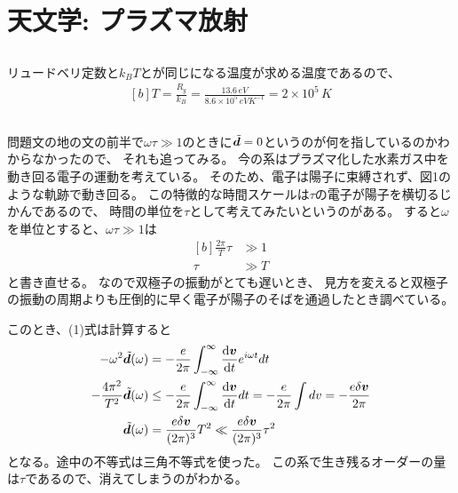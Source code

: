 \documentclass[../../sp_2017.tex]{subfiles}
\begin{document}
\setcounter{section}{5}
\section{天文学: プラズマ放射}
\subsection{}
リュードベリ定数と\(k_BT\)とが同じになる温度が求める温度であるので、
\begin{equation}\begin{aligned}[b]
    T = \frac{R_y}{k_B}=\frac{13.6 \,\si{eV}}{8.6\times 10^5 \,\si{eV K^{-1}}}= 2\times10^5 \,\si{K}
\end{aligned}\end{equation}
\subsection{}
問題文の地の文の前半で\(\omega \tau\gg 1\)のときに\(\tilde{\vb*{d}}=0\)というのが何を指しているのかわからなかったので、
それも追ってみる。
今の系はプラズマ化した水素ガス中を動き回る電子の運動を考えている。
そのため、電子は陽子に束縛されず、図1のような軌跡で動き回る。
この特徴的な時間スケールは\(\tau\)の電子が陽子を横切るじかんであるので、
時間の単位を\(\tau\)として考えてみたいというのがある。
すると\(\omega\)を単位とすると、\(\omega \tau\gg 1\)は
\begin{equation}\begin{aligned}[b]
    \frac{2\pi}{T}\tau &\gg 1\\
    \tau &\gg T
\end{aligned}\end{equation}
と書き直せる。
なので双極子の振動がとても遅いとき、
見方を変えると双極子の振動の周期よりも圧倒的に早く電子が陽子のそばを通過したとき調べている。

このとき、(1)式は計算すると
\begin{equation}\begin{aligned}[b]
    -\omega^2\tilde{\vb*{d}}(\omega)
        &= -\frac{e}{2\pi}\int_{-\infty}^\infty\dv{\vb*{v}}{t}e^{i\omega t}dt\\
    -\frac{4\pi^2}{T^2}\tilde{\vb*{d}}(\omega)
        &\leq-\frac{e}{2\pi}\int_{-\infty}^\infty\dv{\vb*{v}}{t}dt
        = -\frac{e}{2\pi}\int dv
        = -\frac{e\delta \vb*{v}}{2\pi}\\
    \tilde{\vb*{d}}(\omega)
        &= \frac{e\delta \vb*{v}}{(2\pi)^3}T^2
        \ll \frac{e\delta \vb*{v}}{(2\pi)^3}\tau^2
\end{aligned}\end{equation}
となる。途中の不等式は三角不等式を使った。
この系で生き残るオーダーの量は\(\tau\)であるので、消えてしまうのがわかる。
\end{document}
